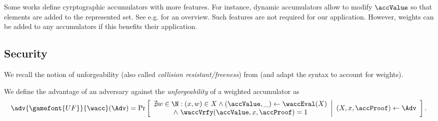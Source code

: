 \begin{remark}
  Some works define cyrptographic accumulators with more features. For instance, dynamic accumulators \cite{C:CamLys02} allow to modify $\accValue$ so that elements are added to the represented set. See e.g. \cite{RSA:ATSM09} for an overview. Such features are not required for our application. However, weights can be added to any accumulators if this benefits their application.
\end{remark}

\subsection{Security}
We recall the notion of unforgeability (also called \emph{collision resistant/freeness}) from \cite{RSA:DerHanSla15} (and adapt the syntax to account for weights).
\begin{definition}\label{def:acc_unforgeability}
  We define the advantage of an adversary \Adv against the
  \emph{unforgeability} of a weighted accumulator \wacc as
  \[
    \adv{\gamefont{UF}}{\wacc}(\Adv) = \Pr
    \left[
      \begin{array}{c}
        \nexists w\in\N : (x,w) \in X \wedge (\accValue, \_) \gets \waccEval(X)\\
        \wedge\ \waccVrfy(\accValue, x, \accProof) = 1
      \end{array}
      \middle\vert
      \begin{array}{c}
        (X, x, \accProof) \gets \Adv
      \end{array}
    \right].
  \]
\end{definition}

